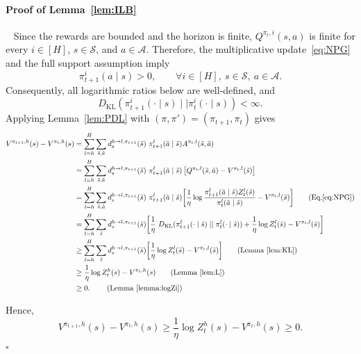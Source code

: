 \documentclass[11pt]{article}
\begin{document}
\paragraph{Proof of Lemma~\ref{lem:ILB}}~\newline
Since the rewards are bounded and
the horizon is finite, $Q^{\pi_t,i}(s,a)$ is finite for every
$i\in[H]$, $s\in\mathcal S$, and $a\in\mathcal A$. Therefore, the
multiplicative update~\eqref{eq:NPG} and the full support assumption
imply
\[
\pi_{t+1}^i(a\mid s)>0,
\qquad
\forall i\in[H],\ s\in\mathcal S,\ a\in\mathcal A.
\]
Consequently, all logarithmic ratios below are well-defined, and
\[
D_{\mathrm{KL}}\!\left(
\pi_{t+1}^i(\cdot\mid s)
\mid\mid
\pi_t^i(\cdot\mid s)
\right)
<\infty.
\]
Applying Lemma~\ref{lem:PDL} with
$(\pi,\pi')=(\pi_{t+1},\pi_t)$ gives
\begin{align*} 
V^{\pi_{t+1},h}(s)  - V^{\pi_t,h}(s)
&= \sum^H_{l=h}  \sum_{\tilde{s},\tilde{a}} d^{{h} \to {l}, \pi_{t+1}}_s (\tilde{s}) \ \pi^{l
}_{t+1} (\tilde{a}\mid \tilde{s})   A^{\pi_t,l}(\tilde{s}, \tilde{a})  \\
& = \sum^H_{l=h} 
 \sum_{\tilde{s},\tilde{a}} d^{{h} \to {l}, \pi_{t+1}}_s (\tilde{s}) \ \pi^{l}_{t+1} (\tilde{a}\mid \tilde{s})  \left[Q^{\pi_t,{l}} (\tilde{s}, \tilde{a}) -V^{\pi_t,l} (\tilde{s}) \right]  \\    
& =\sum^H_{l=h}  \sum_{\tilde{s},\tilde{a}} d^{{h} \to {l}, \pi_{t+1}}_s (\tilde{s}) \ \pi^{l}_{t+1} (\tilde{a}\mid \tilde{s}) \bigg[ \frac{1}{\eta}  \log \frac{\pi^{l}_{t+1}(\tilde{a}\mid \tilde{s}){Z^{l}_t(\tilde{s})}}{\pi^{l}_t (\tilde{a}\mid \tilde{s})}-V^{\pi_t,l} (\tilde{s}) \bigg] \tag{\text{Eq.}\eqref{eq:NPG}}\\
& = \sum^H_{l=h} \sum_{\tilde{s}} d^{{h} \to {l}, \pi_{t+1}}_s (\tilde{s}) \bigg[\frac{1}{\eta}  \ D_{\mathrm{KL}}(\pi^{l}_{t+1} (\cdot \mid \tilde{s}) \mid\mid \pi^{l}_{t}(\cdot \mid\tilde{s})) +\frac{1}{\eta}  \log{Z^{l}_t(\tilde{s})}-V^{\pi_t,l} (\tilde{s})\bigg] \\
& \geq \sum^H_{l=h} \sum_{\tilde{s}} d^{{h} \to {l}, \pi_{t+1}}_s (\tilde{s}) \bigg[\frac{1}{\eta} \log{Z^{l}_t(\tilde{s})} -V^{\pi_t,l} (\tilde{s}) \bigg]  \tag{\text Lemma {\ref{lem:KL}}} \\
& \geq \frac{1}{\eta}  \log{Z^{h}_t(s) }-V^{\pi_t, h} (s)  \tag{\text Lemma {\ref{lem:L}}} \\
& \geq 0. \  \tag{\text Lemma {\ref{lemma:logZi}}}
\end{align*}

Hence,
\[V^{\pi_{t+1},h}(s)-V^{\pi_t,h}(s) \geq \frac{1}{\eta}  \log{Z^{h}_t(s)}-V^{\pi_t, h} (s) \geq 0.\]
\hfill
$\square$
\end{document}
